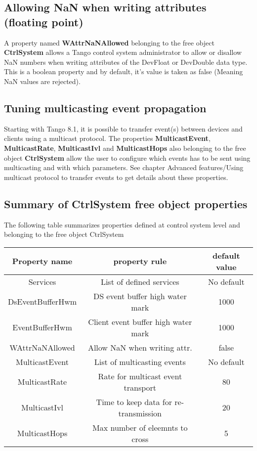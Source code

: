 \subsection{Allowing NaN when writing attributes (floating point)}

A property named \textbf{WAttrNaNAllowed}
belonging to the free object \textbf{CtrlSystem}
allows a Tango control system administrator to allow or disallow NaN
numbers when writing attributes of the DevFloat or DevDouble data
type. This is a boolean property and by default, it's value is taken
as false (Meaning NaN values are rejected).

\subsection{Tuning multicasting event propagation}

Starting with Tango 8.1, it is possible to transfer event(s) between
devices and clients using a multicast protocol. The properties \textbf{MulticastEvent},
\textbf{MulticastRate}, \textbf{MulticastIvl}
and \textbf{MulticastHops} also belonging to
the free object \textbf{CtrlSystem} allow the user to configure which
events has to be sent using multicasting and with which parameters.
See chapter \textquotedbl{}Advanced features/Using multicast protocol
to transfer events\textquotedbl{} to get details about these properties.

\subsection{Summary of CtrlSystem free object properties}

The following table summarizes properties defined at control system
level and belonging to the free object CtrlSystem

\vspace{0.3cm}

\begin{center}
\begin{longtable}{|c|c|c|}
\hline 
Property name & property rule & default value\tabularnewline
\hline 
\hline 
Services & List of defined services & No default\tabularnewline
\hline 
DsEventBufferHwm & DS event buffer high water mark & 1000\tabularnewline
\hline 
EventBufferHwm & Client event buffer high water mark & 1000\tabularnewline
\hline 
WAttrNaNAllowed & Allow NaN when writing attr. & false\tabularnewline
\hline 
MulticastEvent & List of multicasting events & No default\tabularnewline
\hline 
MulticastRate & Rate for multicast event transport & 80\tabularnewline
\hline 
MulticastIvl & Time to keep data for re-transmission & 20\tabularnewline
\hline 
MulticastHops & Max number of eleemnts to cross & 5\tabularnewline
\hline 
\end{longtable}
\par\end{center}

